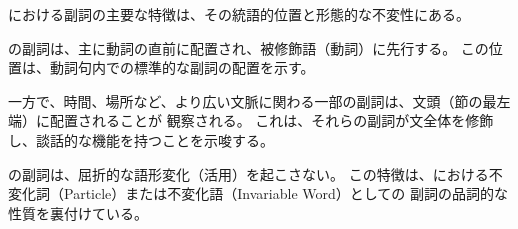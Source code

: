 \langname における副詞の主要な特徴は、その統語的位置と形態的な不変性にある。

\langname の副詞は、主に動詞の直前に配置され、被修飾語（動詞）に先行する。
この位置は、動詞句内での標準的な副詞の配置を示す。

一方で、時間、場所など、より広い文脈に関わる一部の副詞は、文頭（節の最左端）に配置されることが
観察される。
これは、それらの副詞が文全体を修飾し、談話的な機能を持つことを示唆する。

\langname の副詞は、屈折的な語形変化（活用）を起こさない。
この特徴は、\langname における不変化詞（Particle）または不変化語（Invariable Word）としての
副詞の品詞的な性質を裏付けている。